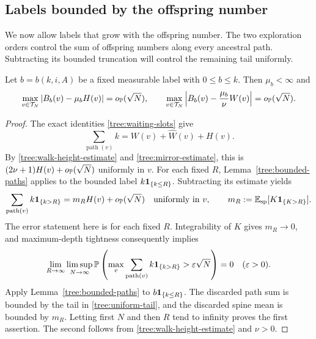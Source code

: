 \subsection{Labels bounded by the offspring number}

We now allow labels that grow with the offspring number. The two
exploration orders control the sum of offspring numbers along every
ancestral path. Subtracting its bounded truncation will control the
remaining tail uniformly.

\begin{theorem}
\label{tree:paths}
Let $b=b(k,i,A)$ be a fixed measurable label with $0\leq b\leq k$.
Then $\mu_b<\infty$ and
\begin{equation}
 \max_{v\in\mathcal T_N}|B_b(v)-\mu_bH(v)|=o_{\P}(\sqrt N),
 \qquad
 \max_{v\in\mathcal T_N}
 \left|B_b(v)-\frac{\mu_b}{\nu}W(v)\right|=o_{\P}(\sqrt N).
 \label{tree:marked-sums}
\end{equation}
\end{theorem}
\begin{proof}
The exact identities \eqref{tree:waiting-slots} give
\begin{equation}
 \sum_{\operatorname{path}(v)}k=W(v)+\widehat W(v)+H(v).
 \label{tree:total-label}
\end{equation}
By \eqref{tree:walk-height-estimate} and \eqref{tree:mirror-estimate},
this is $(2\nu+1)H(v)+o_{\P}(\sqrt N)$ uniformly in $v$.  For each
fixed $R$, Lemma~\ref{tree:bounded-paths} applies to the bounded label
$k\1_{\{k\leq R\}}$.  Subtracting its estimate yields
\begin{equation}
 \sum_{\operatorname{path}(v)}k\1_{\{k>R\}}
 =m_RH(v)+o_{\P}(\sqrt N)
 \quad\hbox{uniformly in }v,
 \qquad m_R:=\E_{\mathrm{sp}}[K\1_{\{K>R\}}].
 \label{tree:tail-estimate}
\end{equation}
The error statement here is for each fixed $R$.  Integrability of $K$
gives $m_R\to0$, and maximum-depth tightness consequently implies
\begin{equation}
 \lim_{R\to\infty}\limsup_{N\to\infty}
 \P\left(\max_v\sum_{\operatorname{path}(v)}
 k\1_{\{k>R\}}>\varepsilon\sqrt N\right)=0
 \quad(\varepsilon>0).
 \label{tree:uniform-tail}
\end{equation}
Apply Lemma~\ref{tree:bounded-paths} to $b\1_{\{k\leq R\}}$.
The discarded path sum is bounded by the tail in
\eqref{tree:uniform-tail}, and the discarded spine mean is bounded by
$m_R$.  Letting first $N$ and then $R$ tend to infinity proves the first
assertion.  The second follows from
\eqref{tree:walk-height-estimate} and $\nu>0$.
\end{proof}

